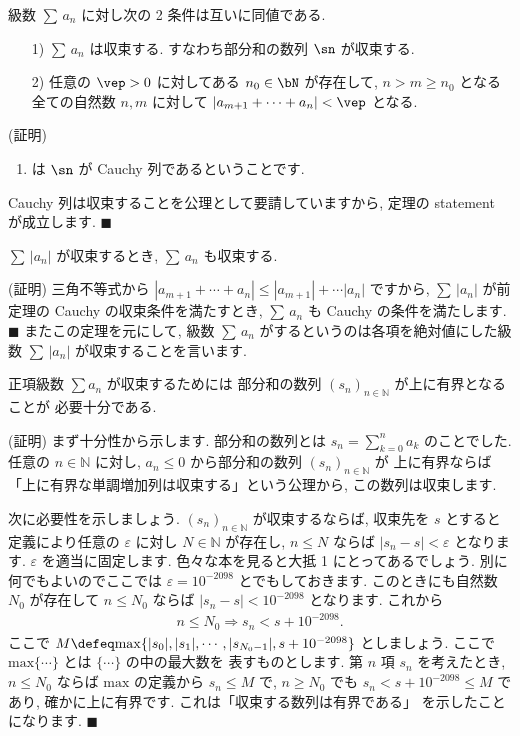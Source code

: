 \documentclass[openany, a4paper, oneside]{jsbook}
\begin{document}
\begin{thm}
級数 $\sum\, a_n$ に対し次の 2 条件は互いに同値である.
\begin{enumerate}
    \item[1)] $\sum\,a_n$ は収束する. すなわち部分和の数列 $\sn$ が収束する.
    \item[2)] 任意の $\vep>0$ に対してある $n_0\in\bN$ が存在して,
     $n>m\geq n_0$ となる全ての自然数 $n,m$ に対して $|a_{m+1}+\dotsb+a_n|<\vep$ となる.
\end{enumerate}
\end{thm}
(証明)
\begin{enumerate}
\item は $\sn$ が Cauchy 列であるということです.
\end{enumerate}
Cauchy 列は収束することを公理として要請していますから, 定理の statement が成立します.  $\blacksquare$

\begin{thm}
 $\sum\,|a_n|$ が収束するとき,  $\sum \, a_n$ も収束する.
\end{thm}
(証明)
三角不等式から $|a_{m+1}+\dotsb+a_n|\leq |a_{m+1}|+\dotsb|a_n|$ ですから,
$\sum\,|a_n|$ が前定理の Cauchy の収束条件を満たすとき,
$\sum\,a_n$ も Cauchy の条件を満たします.  $\blacksquare$
またこの定理を元にして, 級数 $\sum\, a_n$ がするというのは各項を絶対値にした級数
 $\sum\, |a_n|$ が収束することを言います.

\begin{thm}
正項級数 $\sum a_n$ が収束するためには
部分和の数列 $(s_n)_{n \in \mathbb{N}}$ が上に有界となることが
必要十分である.
\end{thm}
(証明)
まず十分性から示します. 部分和の数列とは $s_n=\sum_{k=0}^n a_k$ のことでした.
任意の $n\in \mathbb{N}$ に対し,
 $a_n \leq 0$ から部分和の数列 $(s_n)_{n \in \mathbb{N}}$ が
上に有界ならば「上に有界な単調増加列は収束する」という公理から, この数列は収束します.

次に必要性を示しましょう.  $(s_n)_{n \in \mathbb{N}}$ が収束するならば,
収束先を $s$ とすると
定義により任意の $\varepsilon$ に対し $N \in \mathbb{N}$ が存在し,
 $n \leq N$ ならば $|s_n - s| < \varepsilon$ となります.
 $\varepsilon$ を適当に固定します. 色々な本を見ると大抵 1 にとってあるでしょう.
別に何でもよいのでここでは $\varepsilon =10^{-2098}$ とでもしておきます.
このときにも自然数 $N_0$ が存在して $n \leq N_0$ ならば
 $|s_n - s| < 10^{-2098}$ となります. これから
\begin{align}
    n \leq N_0 \Longrightarrow s_n <s + 10^{-2098}.
\end{align}
ここで $M\defeq\mathrm{max} \{ |s_0|,|s_1|,\dotsb,|s_{N_0-1}|,s+10^{-2098} \}$
としましょう. ここで $\mathrm{max}\{\dotsb \}$ とは $\{\dotsb \}$ の中の最大数を
表すものとします.
第 $n$ 項 $s_n$ を考えたとき,  $n\leq N_0$ ならば $\mathrm{max}$ の定義から
 $s_n \leq M$ で,  $n \geq N_0$ でも $s_n <s+10^{-2098} \leq M$ であり,
確かに上に有界です. これは「収束する数列は有界である」
を示したことになります.  $\blacksquare$
\end{document}
